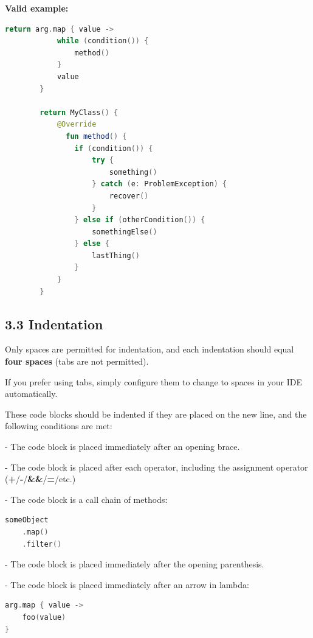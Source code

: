 \textbf{Valid example:}



\begin{lstlisting}[language=Kotlin]
        return arg.map { value ->
            while (condition()) {
                method()
            }
            value 
        }

        return MyClass() {
            @Override
              fun method() {
                if (condition()) {
                    try {
                        something()
                    } catch (e: ProblemException) {
                        recover()
                    }
                } else if (otherCondition()) {
                    somethingElse()
                } else {
                    lastThing()
                }
            }
        }
\end{lstlisting}


\subsection*{\textbf{3.3 Indentation}}

\label{sec:3.3}



Only spaces are permitted for indentation, and each indentation should equal \textbf{four spaces} (tabs are not permitted).

If you prefer using tabs, simply configure them to change to spaces in your IDE automatically.

These code blocks should be indented if they are placed on the new line, and the following conditions are met:

-	The code block is placed immediately after an opening brace.

-	The code block is placed after each operator, including the assignment operator (\textbf{+}/\textbf{-}/\textbf{\&\&}/\textbf{=}/etc.)

-	The code block is a call chain of methods:

\begin{lstlisting}[language=Kotlin]
someObject
    .map()
    .filter()
\end{lstlisting}
-  The code block is placed immediately after the opening parenthesis.

-  The code block is placed immediately after an arrow in lambda:



\begin{lstlisting}[language=Kotlin]
arg.map { value ->
    foo(value)
}
\end{lstlisting}
    

